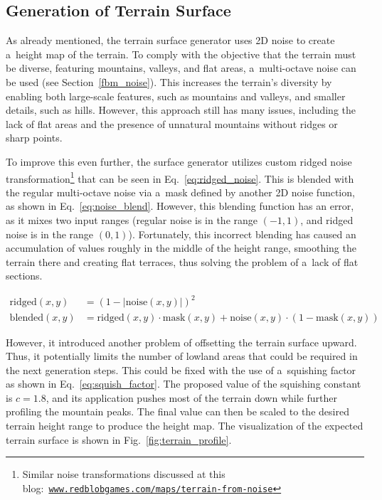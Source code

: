 \subsection{Generation of Terrain Surface}\label{terrain_surface_height_map}

As already mentioned, the terrain surface generator uses 2D noise to create a~height map of the terrain. To comply with the objective that the terrain must be diverse, featuring mountains, valleys, and flat areas, a~multi-octave noise can be used (see Section~\ref{fbm_noise}). This increases the terrain's diversity by enabling both large-scale features, such as mountains and valleys, and smaller details, such as hills. However, this approach still has many issues, including the lack of flat areas and the presence of unnatural mountains without ridges or sharp points.

To improve this even further, the surface generator utilizes custom ridged noise transformation\footnote{Similar noise transformations discussed at this blog:~\href{https://www.redblobgames.com/maps/terrain-from-noise/}{\texttt{www.redblobgames.com/maps/terrain-from-noise}}} that can be seen in Eq.~\ref{eq:ridged_noise}. This is blended with the regular multi-octave noise via a~mask defined by another 2D noise function, as shown in Eq.~\ref{eq:noise_blend}. However, this blending function has an error, as it mixes two input ranges (regular noise is in the range $\left(-1,1\right)$, and ridged noise is in the range $\left(0,1\right)$). Fortunately, this incorrect blending has caused an accumulation of values roughly in the middle of the height range, smoothing the terrain there and creating flat terraces, thus solving the problem of a~lack of flat sections.

\begin{align}
    \text{ridged}(x,y) &= \left(1 - \left|\text{noise}(x,y)\right|\right)^{2}
    \label{eq:ridged_noise} \\
    \text{blended}(x,y) &= \text{ridged}(x,y) \cdot \text{mask}(x,y)
    + \text{noise}(x,y) \cdot \left(1 -\text{mask}(x,y)\right)
    \label{eq:noise_blend}
\end{align}

However, it introduced another problem of offsetting the terrain surface upward. Thus, it potentially limits the number of lowland areas that could be required in the next generation steps. This could be fixed with the use of a~squishing factor as shown in Eq.~\ref{eq:squish_factor}. The proposed value of the squishing constant is $c = 1.8$, and its application pushes most of the terrain down while further profiling the mountain peaks. The final value can then be scaled to the desired terrain height range to produce the height map. The visualization of the expected terrain surface is shown in Fig.~\ref{fig:terrain_profile}. 

